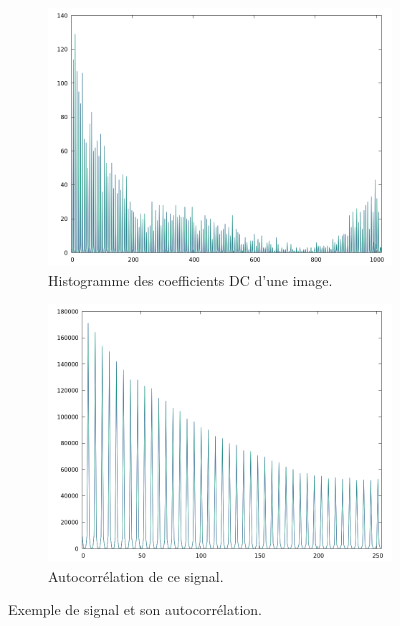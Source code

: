 \documentclass[utf8,final]{stageM2R} %
\begin{document}
\begin{figure}
  \begin{subfigure}{.5\textwidth}
    \centering
    \includegraphics[width=\linewidth]{images/signal}
    \caption{Histogramme des coefficients DC d'une image.}
    \label{fig:signal}
  \end{subfigure}
  \begin{subfigure}{.5\textwidth}
    \centering
    \includegraphics[width=\linewidth]{images/autocorrelation}
    \caption{Autocorrélation de ce signal.}
    \label{fig:autocorrel}
  \end{subfigure}
  \caption{Exemple de signal et son autocorrélation.}
\end{figure}
\end{document}
